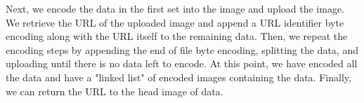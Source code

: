 Next, we encode the data in the first set into the image and upload the image. We retrieve the URL of the uploaded image and append a URL identifier byte encoding along with the URL itself to the remaining data. Then, we repeat the encoding steps by appending the end of file byte encoding, splitting the data, and uploading until there is no data left to encode. At this point, we have encoded all the data and have a "linked list" of encoded images containing the data. Finally, we can return the URL to the head image of data. 
